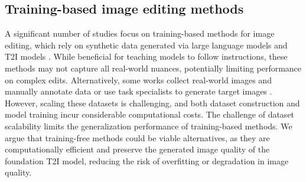 \documentclass{article}
\begin{document}
\subsection{Training-based image editing methods}


A significant number of studies focus on training-based methods for image editing, which rely on synthetic data generated via large language models and T2I models \citep{brooks2023instructpix2pix, hui2024hq}. While beneficial for teaching models to follow instructions, these methods may not capture all real-world nuances, potentially limiting performance on complex edits. Alternatively, some works collect real-world images and manually annotate data or use task specialists to generate target images \citep{zhang2023magicbrush, wasserman2024paint, wei2024omniedit}. However, scaling these datasets is challenging, and both dataset construction and model training incur considerable computational costs.
The challenge of dataset scalability limits the generalization performance of training-based methods. We argue that training-free methods could be viable alternatives, as they are computationally efficient and preserve the generated image quality of the foundation T2I model, reducing the risk of overfitting or degradation in image quality.




\end{document}
